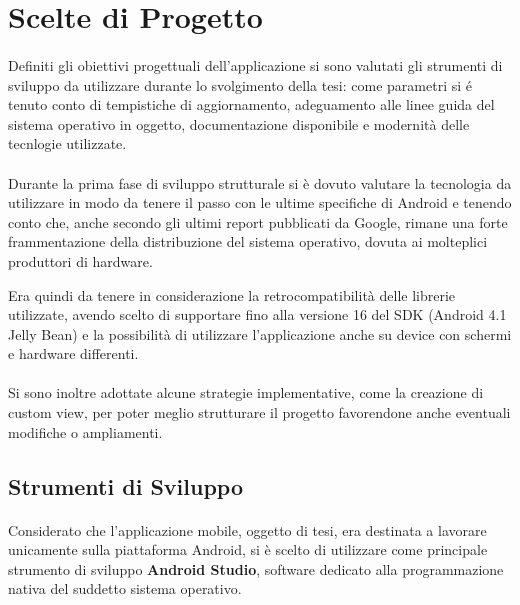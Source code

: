 \section{Scelte di Progetto}
\paragraph{}
Definiti gli obiettivi progettuali dell'applicazione si sono valutati gli strumenti di sviluppo da utilizzare durante lo svolgimento della tesi: come parametri si é tenuto conto di tempistiche di aggiornamento, adeguamento alle linee guida del sistema operativo in oggetto, documentazione disponibile e modernità delle tecnlogie utilizzate.


\paragraph{}
Durante la prima fase di sviluppo strutturale si è dovuto valutare la tecnologia da utilizzare in modo da tenere il passo con le ultime specifiche di Android e tenendo conto che, anche secondo gli ultimi report pubblicati da Google, rimane una forte frammentazione della distribuzione del sistema operativo, dovuta ai molteplici produttori di hardware. \autocite{ANDROIDSTUDIO:DASHBOARD}

Era quindi da tenere in considerazione la retrocompatibilità delle librerie utilizzate, avendo scelto di supportare fino alla versione 16 del SDK (Android 4.1 Jelly Bean) e la possibilità di utilizzare l'applicazione anche su device con schermi e hardware differenti.

\paragraph{}
Si sono inoltre adottate alcune strategie implementative, come la creazione di custom view, per poter meglio strutturare il progetto favorendone anche eventuali modifiche o ampliamenti.

\subsection{Strumenti di Sviluppo}
\paragraph{}
Considerato che l'applicazione mobile, oggetto di tesi, era destinata a lavorare unicamente sulla piattaforma Android, si è scelto di utilizzare come principale strumento di sviluppo \textbf{Android Studio}, software dedicato alla programmazione nativa del suddetto sistema operativo. \autocite{ANDROIDDEVELOPERS:FIRSTAPP}

